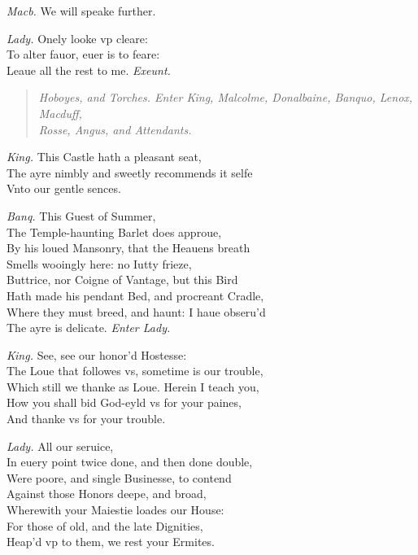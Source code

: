 \documentclass[12pt]{sides}
\newcommand{\StageDir}[1]{\begin{quote}\centering\em #1\end{quote}}
\newcommand{\clStageDir}[1]{\hspace*{\fill}\textit{#1}\hspace*{\fill}}
\newcommand{\dia}[1]{\hskip 15pt\textit{#1}\hskip 6pt}
\begin{document}
\begin{multicols}{2}
            \dia{Macb.} We will speake further.
            
            \dia{Lady.} Onely looke vp cleare: \\ To alter fauor, euer is to feare: \\ Leaue all the rest to me. \hspace{32pt} \textit{Exeunt.}
            \StageDir{Hoboyes, and Torches. Enter King, Malcolme, Donalbaine, Banquo, Lenox, Macduff, \\Rosse, Angus, and Attendants.}

            \dia{King.} This Castle hath a pleasant seat, \\ The ayre nimbly and sweetly recommends it selfe \\ Vnto our gentle sences.

            \dia{Banq.} This Guest of Summer, \\ The Temple-haunting Barlet does approue, \\ By his loued Mansonry, that the Heauens breath \\ Smells wooingly here: no Iutty frieze, \\ Buttrice, nor Coigne of Vantage, but this Bird \\ Hath made his pendant Bed, and procreant Cradle, \\ Where they must breed, and haunt: I haue obseru'd \\ The ayre is delicate. \clStageDir{Enter Lady.}

            \dia{King.} See, see our honor'd Hostesse: \\ The Loue that followes vs, sometime is our trouble, \\ Which still we thanke as Loue. Herein I teach you, \\ How you shall bid God-eyld vs for your paines, \\ And thanke vs for your trouble.

            \dia{Lady.} All our seruice, \\ In euery point twice done, and then done double, \\ Were poore, and single Businesse, to contend \\ Against those Honors deepe, and broad, \\ Wherewith your Maiestie loades our House: \\ For those of old, and the late Dignities, \\ Heap'd vp to them, we rest your Ermites.


\end{multicols}
\end{document}
